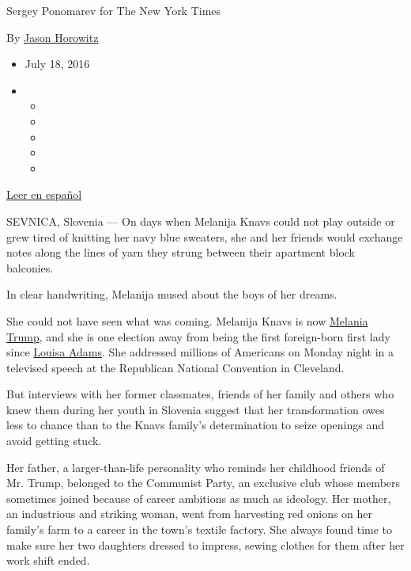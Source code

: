Sergey Ponomarev for The New York Times

By \href{https://www.nytimes3xbfgragh.onion/by/jason-horowitz}{Jason
Horowitz}

\begin{itemize}
\item
  July 18, 2016
\item
  \begin{itemize}
  \item
  \item
  \item
  \item
  \item
  \end{itemize}
\end{itemize}

\href{https://www.nytimes3xbfgragh.onion/es/2016/07/19/melania-trump-de-un-pueblo-en-eslovenia-a-las-puertas-de-la-casa-blanca/}{Leer
en español}

SEVNICA, Slovenia --- On days when Melanija Knavs could not play outside
or grew tired of knitting her navy blue sweaters, she and her friends
would exchange notes along the lines of yarn they strung between their
apartment block balconies.

In clear handwriting, Melanija mused about the boys of her dreams.

She could not have seen what was coming. Melanija Knavs is now
\href{http://www.nytimes3xbfgragh.onion/2016/07/20/us/politics/melania-trump-speech.html}{Melania
Trump}, and she is one election away from being the first foreign-born
first lady since
\href{https://www.whitehouse.gov/1600/first-ladies/louisaadams}{Louisa
Adams}. She addressed millions of Americans on Monday night in a
televised speech at the Republican National Convention in Cleveland.

But interviews with her former classmates, friends of her family and
others who knew them during her youth in Slovenia suggest that her
transformation owes less to chance than to the Knavs family's
determination to seize openings and avoid getting stuck.

Her father, a larger-than-life personality who reminds her childhood
friends of Mr. Trump, belonged to the Communist Party, an exclusive club
whose members sometimes joined because of career ambitions as much as
ideology. Her mother, an industrious and striking woman, went from
harvesting red onions on her family's farm to a career in the town's
textile factory. She always found time to make sure her two daughters
dressed to impress, sewing clothes for them after her work shift ended.

